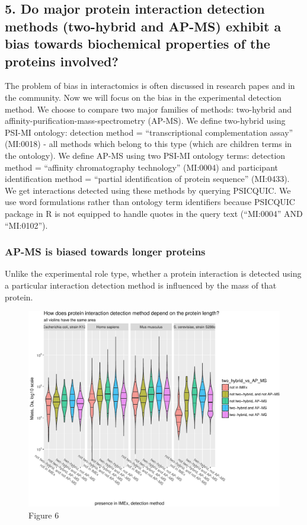 \documentclass[]{article}
\begin{document}
\subsection{5. Do major protein interaction detection methods
(two-hybrid and AP-MS) exhibit a bias towards biochemical properties of
the proteins
involved?}\label{do-major-protein-interaction-detection-methods-two-hybrid-and-ap-ms-exhibit-a-bias-towards-biochemical-properties-of-the-proteins-involved}

The problem of bias in interactomics is often discussed in research
papes and in the community. Now we will focus on the bias in the
experimental detection method. We choose to compare two major families
of methods: two-hybrid and affinity-purification-mass-spectrometry
(AP-MS). We define two-hybrid using PSI-MI ontology: detection method =
``transcriptional complementation assay'' (MI:0018) - all methods which
belong to this type (which are children terms in the ontology). We
define AP-MS using two PSI-MI ontology terms: detection method =
``affinity chromatography technology'' (MI:0004) and participant
identification method = ``partial identification of protein sequence''
(MI:0433). We get interactions detected using these methods by querying
PSICQUIC. We use word formulations rather than ontology term identifiers
because PSICQUIC package in R is not equipped to handle quotes in the
query text (``MI:0004'' AND ``MI:0102'').

\subsubsection{AP-MS is biased towards longer
proteins}\label{ap-ms-is-biased-towards-longer-proteins}

Unlike the experimental role type, whether a protein interaction is
detected using a particular interaction detection method is influenced
by the mass of that protein.

\begin{figure}[htbp]
\centering
\includegraphics{final_report_files/figure-latex/interaction_types_combine_and_plot-1.pdf}
\caption{Figure 6}
\end{figure}
\end{document}
